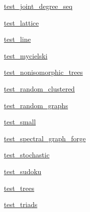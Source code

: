 \begin{DoxyCompactItemize}
\item 
 \hyperlink{namespacenetworkx_1_1generators_1_1tests_1_1test__joint__degree__seq}{test\+\_\+joint\+\_\+degree\+\_\+seq}
\item 
 \hyperlink{namespacenetworkx_1_1generators_1_1tests_1_1test__lattice}{test\+\_\+lattice}
\item 
 \hyperlink{namespacenetworkx_1_1generators_1_1tests_1_1test__line}{test\+\_\+line}
\item 
 \hyperlink{namespacenetworkx_1_1generators_1_1tests_1_1test__mycielski}{test\+\_\+mycielski}
\item 
 \hyperlink{namespacenetworkx_1_1generators_1_1tests_1_1test__nonisomorphic__trees}{test\+\_\+nonisomorphic\+\_\+trees}
\item 
 \hyperlink{namespacenetworkx_1_1generators_1_1tests_1_1test__random__clustered}{test\+\_\+random\+\_\+clustered}
\item 
 \hyperlink{namespacenetworkx_1_1generators_1_1tests_1_1test__random__graphs}{test\+\_\+random\+\_\+graphs}
\item 
 \hyperlink{namespacenetworkx_1_1generators_1_1tests_1_1test__small}{test\+\_\+small}
\item 
 \hyperlink{namespacenetworkx_1_1generators_1_1tests_1_1test__spectral__graph__forge}{test\+\_\+spectral\+\_\+graph\+\_\+forge}
\item 
 \hyperlink{namespacenetworkx_1_1generators_1_1tests_1_1test__stochastic}{test\+\_\+stochastic}
\item 
 \hyperlink{namespacenetworkx_1_1generators_1_1tests_1_1test__sudoku}{test\+\_\+sudoku}
\item 
 \hyperlink{namespacenetworkx_1_1generators_1_1tests_1_1test__trees}{test\+\_\+trees}
\item 
 \hyperlink{namespacenetworkx_1_1generators_1_1tests_1_1test__triads}{test\+\_\+triads}
\end{DoxyCompactItemize}
